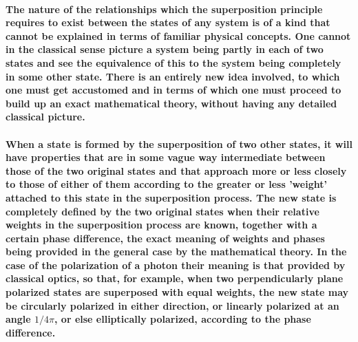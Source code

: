 \documentclass[10pt, kindle, oneside]{kindle}
\begin{document}
\paragraph{The nature of the relationships which the superposition principle requires to exist between the states of any system is of a kind that cannot be explained in terms of familiar physical concepts. One cannot in the classical sense picture a system being partly in each of two states and see the equivalence of this to the system being completely in some other state. There is an entirely new idea involved, to which one must get accustomed and in terms of which one must proceed to build up an exact mathematical theory, without having any detailed classical picture.}
\paragraph{When a state is formed by the superposition of two other states, it will have properties that are in some vague way intermediate between those of the two original states and that approach more or less closely to those of either of them according to the greater or less 'weight' attached to this state in the superposition process. The new state is completely defined by the two original states when their relative weights in the superposition process are known, together with a certain phase difference, the exact meaning of weights and phases being provided in the general case by the mathematical theory. In the case of the polarization of a photon their meaning is that provided by classical optics, so that, for example, when two perpendicularly plane polarized states are superposed with equal weights, the new state may be circularly polarized in either direction, or linearly polarized at an angle $1/4\pi$, or else elliptically polarized, according to the phase difference.}
\end{document}

